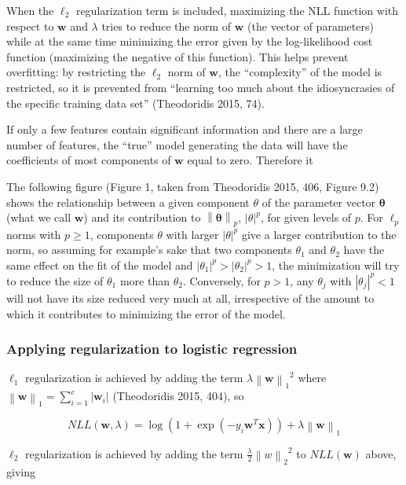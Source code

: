 \documentclass[letterpaper, 11pt]{article}
\newcommand{\norm}[1]{\left\lVert #1 \right\rVert}
\newcommand{\vect}[1]{\boldsymbol{#1}}
\begin{document}
When the $\ell_2$ regularization term is included, maximizing the NLL function with respect to $\vect{w}$ and $\lambda$ tries to reduce the norm of $\vect{w}$ (the vector of parameters) while at the same time minimizing the error given by the log-likelihood cost function (maximizing the negative of this function). This helps prevent overfitting: by restricting the $\ell_2$ norm of $\vect{w}$, the ``complexity'' of the model is restricted, so it is prevented from ``learning too much about the idiosyncrasies of the specific training data set'' (Theodoridis 2015, 74).

If only a few features contain significant information and there are a large number of features, the ``true'' model generating the data will have the coefficients of most components of $\vect{w}$ equal to zero. Therefore it 

The following figure (Figure 1, taken from Theodoridis 2015, 406, Figure 9.2) shows the relationship between a given component $\theta$ of the parameter vector $\vect{\theta}$ (what we call $\vect{w}$) and its contribution to $\norm{\vect{\theta}}_p$, $|\theta|^p$, for given levels of $p$. For $\ell_p$ norms with $p \geq 1$, components $\theta$ with larger $|\theta|^p$ give a larger contribution to the norm, so assuming for example's sake that two components $\theta_1$ and $\theta_2$ have the same effect on the fit of the model and $|\theta_1|^p > |\theta_2|^p > 1$, the minimization will try to reduce the size of $\theta_1$ more than $\theta_2$. Conversely, for $p > 1$, any $\theta_j$ with $|\theta_j|^p < 1$ will not have its size reduced very much at all, irrespective of the amount to which it contributes to minimizing the error of the model.

\subsubsection{Applying regularization to logistic regression}

$\ell_1$ regularization is achieved by adding the term $\lambda {\norm{\vect{w}}_1}^2$ where $\norm{\vect{w}}_1 = \sum_{i=1}^{c} |\vect{w}_i|$ (Theodoridis 2015, 404), so

\begin{equation*}
  NLL(\vect{w}, \lambda) = \log(1 + \exp(-y_i \vect{w}^T\vect{x})) + \lambda {\norm{\vect{w}}_1}
\end{equation*}

$\ell_2$ regularization is achieved by adding the term $\frac{\lambda}{2} {\norm{w}_2}^2$ to $NLL(\vect{w})$ above, giving
\end{document}
